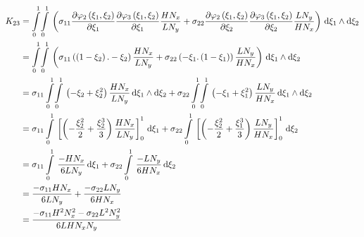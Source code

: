 \begin{equation}
  \begin{aligned}
    K_{23}&=\giint{0}{1}{0}{1}{\pbrac{\sigma_{11}\delby{\lbfn{2}{\xi_{1},\xi_{2}}}{\xi_{1}}\delby{\lbfn{3}{\xi_{1},\xi_{2}}}{\xi_{1}}
        \dfrac{H N_{x}}{L N_{y}}+\sigma_{22}\delby{\lbfn{2}{\xi_{1},\xi_{2}}}{\xi_{2}}\delby{\lbfn{3}{\xi_{1},\xi_{2}}}{\xi_{2}}
        \dfrac{L N_{y}}{H N_{x}}}}{\xi_{1}}{\xi_{2}}\\
    &=\giint{0}{1}{0}{1}{\pbrac{\sigma_{11}\pbrac{\pbrac{1-\xi_{2}}.-\xi_{2}}\dfrac{H N_{x}}{L N_{y}}+
    \sigma_{22}\pbrac{-\xi_{1}.\pbrac{1-\xi_{1}}}\dfrac{L N_{y}}{H N_{x}}}}{\xi_{1}}{\xi_{2}} \\
    &=\sigma_{11}\giint{0}{1}{0}{1}{\pbrac{-\xi_{2}+\xi_{2}^{2}}\dfrac{H N_{x}}{L N_{y}}}{\xi_{1}}{\xi_{2}}+
    \sigma_{22}\giint{0}{1}{0}{1}{\pbrac{-\xi_{1}+\xi_{1}^{2}}\dfrac{L N_{y}}{H N_{x}}}{\xi_{1}}{\xi_{2}} \\
    &=\sigma_{11}\gint{0}{1}{\sqbrac{\pbrac{-\dfrac{\xi_{2}^{2}}{2}+\dfrac{\xi_{2}^{3}}{3}}\dfrac{H N_{x}}{L N_{y}}}_{0}^{1}}{\xi_{1}}+
    \sigma_{22}\gint{0}{1}{\sqbrac{\pbrac{-\dfrac{\xi_{2}^{2}}{2}+\dfrac{\xi_{1}^{3}}{3}}\dfrac{L N_{y}}{H N_{x}}}_{0}^{1}}{\xi_{2}} \\
    &=\sigma_{11}\gint{0}{1}{\dfrac{-H N_{x}}{6 L N_{y}}}{\xi_{1}}+\sigma_{22}\gint{0}{1}{\dfrac{-L N_{y}}{6 H N_{x}}}{\xi_{2}} \\
    &=\dfrac{-\sigma_{11}H N_{x}}{6 L N_{y}}+\dfrac{-\sigma_{22}L N_{y}}{6 H N_{x}} \\
    &=\dfrac{-\sigma_{11}H^{2}N_{x}^{2}-\sigma_{22}L^{2}N_{y}^{2}}{6 L H N_{x} N_{y}}
  \end{aligned}
\end{equation}

